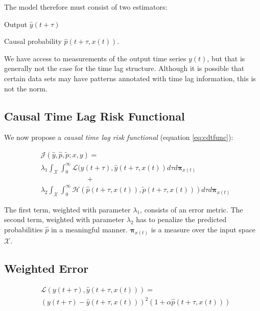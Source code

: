 \documentclass[runningheads]{llncs}
\begin{document}
The model therefore must consist of two estimators:
\begin{inparaenum}[1.]
      \item Output $\hat{y}(t + \tau)$
      \item Causal probability $\hat{p}(t + \tau, x(t))$.
\end{inparaenum} 
We have access to measurements of the output time series $y(t)$, but that is 
generally not the case for the time lag structure. Although it is possible 
that certain data sets may have patterns annotated with time lag information, 
this is not the norm.

\subsection{Causal Time Lag Risk Functional}

We now propose a \emph{causal time lag risk functional} 
(equation \ref{eq:cdtfunc}):

\begin{align}\label{eq:cdtfunc}
&\mathcal{J}(\hat{y}, \hat{p}, \tilde{p}; x, y) = \\
&\nonumber \lambda_1 \int_{\mathcal{X}}{
      \int_{0}^{\infty}{
            \mathcal{L}(y(t + \tau), \hat{y}(t + \tau, x(t))
      }
}d\tau d\mathbf{\pi}_{x(t)} \\ 
& \nonumber \hspace{78pt}  + \\ 
&\nonumber  \lambda_2 \int_{\mathcal{X}}{\int_{0}^{\infty}
{\mathcal{H}\left(\hat{p}(t + \tau, x(t)), \tilde{p}(t + \tau, x(t))\right)}}d\tau d\mathbf{\pi}_{x(t)}
\end{align}

The first term, weighted with parameter $\lambda_1$, consists of an 
error metric. The second term, weighted with parameter $\lambda_2$ has to 
penalize the predicted probabilities $\hat{p}$ in a meaningful manner. 
$\mathbf{\pi}_{x(t)}$ is a measure over the input space $\mathcal{X}$.


\subsection{Weighted Error}


\begin{align}\label{eq:errorfunc}
&\mathcal{L}(y(t + \tau), \hat{y}(t + \tau, x(t))) = \\ 
\nonumber &\left (y(t + \tau) - \hat{y}(t + \tau, x(t)) \right)^2 
(1 + \alpha \hat{p}(t + \tau, x(t)))
\end{align}
\end{document}
